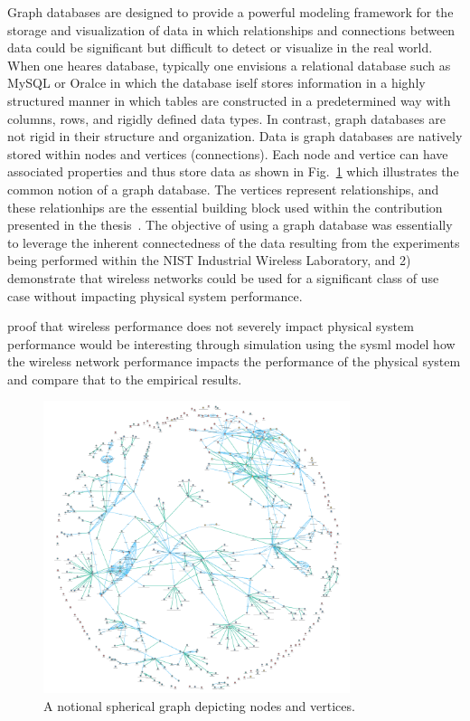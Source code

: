Graph databases are designed to provide a powerful modeling framework for the storage and visualization of data in which relationships and connections between data could be significant but difficult to detect or visualize in the real world.  When one heares database, typically one envisions a relational database such as MySQL or Oralce in which the database iself stores information in a highly structured manner in which tables are constructed in a predetermined way with columns, rows, and rigidly defined data types.  In contrast, graph databases are not rigid in their structure and organization.  Data is graph databases are natively stored within nodes and vertices (connections).  Each node and vertice can have associated properties and thus store data as shown in Fig.~\ref{fig:concl:graphdb-sperical} which illustrates the common notion of a graph database.  The vertices represent relationships, and these relationhips are the essential building block used within the contribution presented in the thesis~\cite{CandellISIT2020.Conf}.  The objective of using a graph database was essentially to leverage the inherent connectedness of the data resulting from the experiments being performed within the NIST Industrial Wireless Laboratory, and 2) demonstrate that wireless networks could be used for a significant class of use case without impacting physical system performance. 

proof that wireless performance does not severely impact physical system performance
would be interesting through simulation using the sysml model how the wireless network performance impacts the performance of the physical system and compare that to the empirical results. 

\begin{figure}[!ht]
	\centering
	\includegraphics[width=0.8\textwidth]{chapter-conclusions/images/spherical-graph.png}
	\caption{A notional spherical graph depicting nodes and vertices.}
	\label{fig:concl:graphdb-sperical}
\end{figure}

